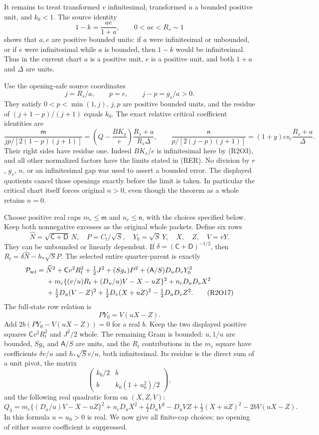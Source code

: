 It remains to treat transformed $v$ infinitesimal, transformed $u$ a
bounded positive unit, and $k_0<1$.  The source identity
\[
1-k=\frac{ae}{1+a},\qquad 0<ae<R_s\sim1
\tag{R2O13}
\]
shows that $a,e$ are positive bounded units: if $a$ were infinitesimal
or unbounded, or if $e$ were infinitesimal while $a$ is bounded, then
$1-k$ would be infinitesimal.  Thus in the current chart $a$ is a
positive unit, $e$ is a positive unit, and both $1+a$ and $\Delta$
are units.

Use the opening-safe source coordinates
\[
j=R_s/a,\qquad p=e,\qquad j-p=g_s/a>0.
\tag{R2O14}
\]
They satisfy $0<p<\min(1,j)$, $j,p$ are positive bounded units, and
the residue of $(j+1-p)/(j+1)$ equals $k_0$.  The exact relative
critical coefficient identities are
\[
\frac{\mathsf m}{jp/[2(1-p)(j+1)]}
 =\left(Q-\frac{BK_s}{e}\right)\frac{R_s+a}{R_s\Delta},
\qquad
\frac{\mathsf n}{p/[2(j-p)(j+1)]}
 =(1+y)c s_c\frac{R_s+a}{\Delta}.
\tag{R2O15}
\]
Their right sides have residue one.  Indeed $BK_s/e$ is infinitesimal
here by (R2O3), and all other normalized factors have the limits stated
in (RER).  No division by $r$, $g_s$, $n$, or an infinitesimal gap
was used to assert a bounded error.  The displayed quotients cancel
those openings exactly before the limit is taken.  In particular the
critical chart itself forces original $n>0$, even though the theorem
as a whole retains $n=0$.

Choose positive real caps $m_c\leq\mathsf m$ and
$n_c\leq\mathsf n$, with the choices specified below.  Keep both
nonnegative excesses as the original whole packets.  Define six rows
\[
\widehat N=\sqrt{\mathsf C+\mathsf D}\,N,\quad
P=C_t/\sqrt S,\quad Y_0=\sqrt S\,Y,
\quad X,\quad Z,\quad V=vY.
\tag{R2O16}
\]
They can be unbounded or linearly dependent.  If
$\delta=(\mathsf C+\mathsf D)^{-1/2}$, then
$R_t=\delta\widehat N-h_*\sqrt S P$.  The selected entire
quarter-parent is exactly
\begin{align*}
\mathcal P_{\rm sel}={}&\widehat N^2+\mathsf C v^2R_t^2
 +\tfrac12J^2+(Sg_*)P^2
 +(\mathsf A/S)D_uD_vY_0^2\\
&+m_c\{(v/u)R_t+(D_u/u)V-X-uZ\}^2
 +n_cD_uD_vX^2\\
&+\tfrac12D_u(V-Z)^2+\tfrac12D_v(X+uZ)^2
 -\tfrac12D_uD_vZ^2.
\tag{R2O17}
\end{align*}
The full-state row relation is
\[
PY_0=V(uX-Z).
\tag{R2O18}
\]
Add $2b(PY_0-V(uX-Z))=0$ for a real $b$.  Keep the two displayed
positive squares $\mathsf C v^2R_t^2$ and $J^2/2$ whole.  The
remaining Gram is bounded: $u,1/u$ are bounded, $Sg_*$ and
$\mathsf A/S$ are units, and the $R_t$ contributions in the
$m_c$ square have coefficients $\delta v/u$ and
$h_*\sqrt S v/u$, both infinitesimal.  Its residue is the direct sum
of a unit pivot, the matrix
\[
\begin{pmatrix}k_0/2&b\\b&k_0(1+u_0^2)/2\end{pmatrix},
\tag{R2O19}
\]
and the following real quadratic form on $(X,Z,V)$:
\[
Q_3=m_c\{(D_u/u)V-X-uZ\}^2+n_cD_uX^2
 +\tfrac12D_uV^2-D_uVZ+\tfrac12(X+uZ)^2
 -2bV(uX-Z).
\tag{R2O20}
\]
In this formula $u=u_0>0$ is real.  We now give all finite-cap choices;
no opening of either source coefficient is suppressed.

